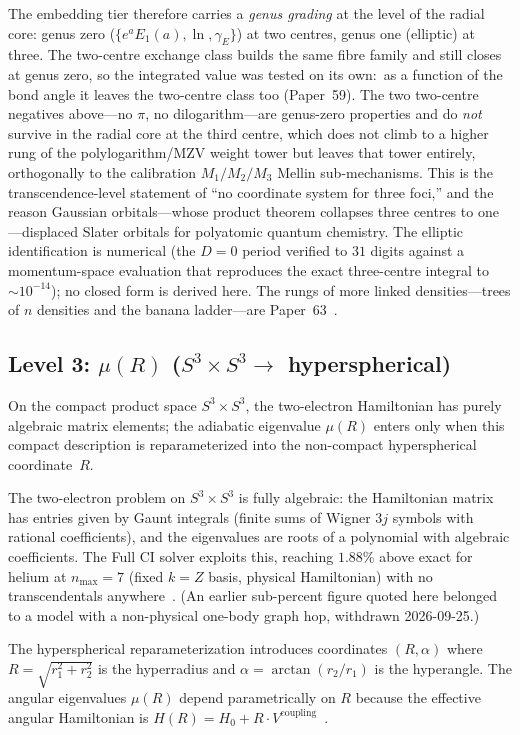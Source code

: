 \documentclass[aps,pra,twocolumn,superscriptaddress,longbibliography]{revtex4-2}
\newcommand{\gvq}[2]{#2}%
\begin{document}
The embedding tier therefore carries a \emph{genus grading} at the level of the
radial core: genus zero
($\{e^a E_1(a), \ln, \gamma_E\}$) at two centres, genus one (elliptic) at
three.  The two-centre exchange class builds the same fibre family and still
closes at genus zero, so the integrated value was tested on its own:\ as a function of
the bond angle it leaves the two-centre class too (Paper~59).  The two two-centre negatives above---no $\pi$, no dilogarithm---are
genus-zero properties and do \emph{not} survive in the radial core at the third centre, which does
not climb to a higher rung of the polylogarithm/MZV weight tower but leaves
that tower entirely, orthogonally to the calibration $M_1/M_2/M_3$ Mellin
sub-mechanisms.  This is the transcendence-level statement of ``no coordinate
system for three foci,'' and the reason Gaussian orbitals---whose product
theorem collapses three centres to one---displaced Slater orbitals for
polyatomic quantum chemistry.  The elliptic identification is numerical (the
$D=0$ period verified to $31$ digits against a momentum-space evaluation that
reproduces the exact three-centre integral to $\sim\!10^{-14}$); no closed
form is derived here.  The rungs of more linked densities---trees of $n$
densities and the banana ladder---are Paper~63~\cite{loutey_paper63}.

\subsection{Level 3: $\mu(R)$ ($S^3 \times S^3 \to$ hyperspherical)}
\label{sec:mu}

On the compact product space $S^3 \times S^3$, the two-electron
Hamiltonian has purely algebraic matrix elements; the adiabatic
eigenvalue $\mu(R)$ enters only when this compact description is
reparameterized into the non-compact hyperspherical coordinate~$R$.

The two-electron problem on $S^3 \times S^3$ is fully algebraic:
the Hamiltonian matrix has entries given by Gaunt integrals
(finite sums of Wigner $3j$ symbols with rational coefficients),
and the eigenvalues are roots of a polynomial with algebraic
coefficients.  The Full CI solver exploits this, reaching
$\gvq{he_gn_phys_n7_pct}{1.88}\%$ above exact for helium at $n_{\max}=7$
(fixed $k=Z$ basis, physical Hamiltonian) with no transcendentals
anywhere~\cite{loutey_fci}.  (An earlier sub-percent figure quoted here
belonged to a model with a non-physical one-body graph hop, withdrawn
2026-09-25.)

The hyperspherical reparameterization introduces coordinates
$(R, \alpha)$ where $R = \sqrt{r_1^2 + r_2^2}$ is the
hyperradius and $\alpha = \arctan(r_2/r_1)$ is the hyperangle.
The angular eigenvalues $\mu(R)$ depend parametrically on $R$
because the effective angular Hamiltonian is
$H(R) = H_0 + R \cdot V^{\mathrm{coupling}}$~\cite{loutey_paper13}.
\end{document}
